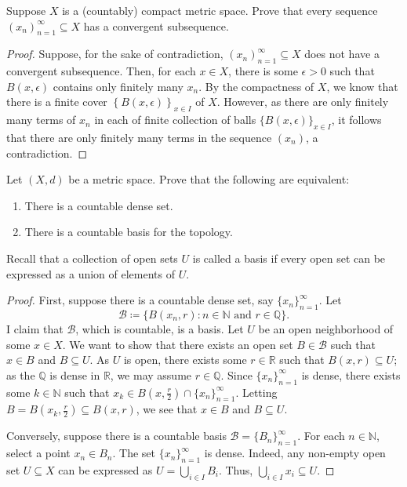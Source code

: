 \documentclass{article}
\begin{document}
\begin{problem}[Spring 2002~\#3]
Suppose \(X\) is a (countably) compact metric space.  Prove that every
sequence \((x_n)_{n=1}^{\infty}\subseteq X\) has a convergent subsequence.
\end{problem}
\begin{proof}
	Suppose, for the sake of contradiction, \((x_n)_{n=1}^{\infty}\subseteq X\)
	does not have a convergent subsequence.  Then, for each \(x\in X\), there is
	some \(\epsilon > 0\) such that \(B(x,\epsilon)\) contains only finitely many
	\(x_n\).  By the compactness of \(X\), we know that there is a finite cover
	\(\left\{ B(x, \epsilon)\right\}_{x\in I}\) of \(X\).  However, as there are
	only finitely many terms of \(x_n\) in each of finite collection of balls
	\(\{B(x, \epsilon)\}_{x\in I}\), it follows that there are only finitely many
	terms in the sequence \((x_n)\), a contradiction.
\end{proof}

\begin{problem}[Spring 2005~\#12]
Let \((X,d)\) be a metric space.  Prove that the following are equivalent:
\begin{enumerate}
	\item There is a countable dense set.
	\item There is a countable basis for the topology.
\end{enumerate}
Recall that a collection of open sets \(U\) is called a basis if every open set
can be expressed as a union of elements of \(U\).
\end{problem}
\begin{proof}
	First, suppose there is a countable dense set, say \(\{x_n\}_{n=1}^{\infty}\).
	Let
	\[
		\mathcal{B}\coloneqq \{B(x_n,r) : n\in \mathbb{N} \text{ and } r\in
		\mathbb{Q}\}
		.\]
	I claim that \(\mathcal{B}\), which is countable, is a basis.  Let \(U\) be
	an open neighborhood of some \(x\in X\).  We want to show that there exists
	an open set \(B\in \mathcal{B}\) such that \(x\in B\) and \(B\subseteq U\).
	As \(U\) is open, there exists some \(r\in \mathbb{R}\) such that \(B(x,
	r)\subseteq U\); as the \(\mathbb{Q}\) is dense in \(\mathbb{R}\), we may
	assume \(r\in \mathbb{Q}\).  Since \(\{x_n\}_{n=1}^{\infty}\) is dense, there
	exists some \(k\in \mathbb{N}\) such that \(x_{k}\in B \left( x,
	\frac{r}{2}\right)\cap \{x_n\}_{n=1}^{\infty}\).  Letting \(B = B \left( x_k,
	\frac{r}{2} \right)\subseteq B(x, r)\), we see that \(x\in B\) and \(B\subseteq
	U\).

	Conversely, suppose there is a countable basis \(\mathcal{B} =
	\{B_n\}_{n=1}^{\infty}\).  For each \(n\in \mathbb{N}\), select a point
	\(x_n\in B_n\).  The set \(\{x_n\}_{n=1}^{\infty}\) is dense.  Indeed, any
	non-empty open set \(U\subseteq X\) can be expressed as \(U = \bigcup_{i\in
		I} B_{i}\).  Thus, \(\bigcup_{i\in I} x_i\subseteq U\).
\end{proof}
\end{document}
